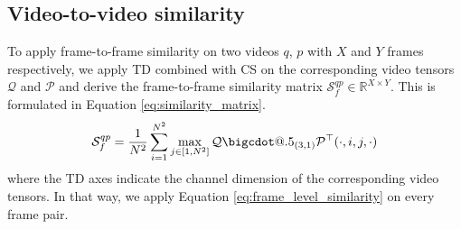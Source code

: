 \documentclass[10pt,twocolumn,letterpaper]{article}
\makeatletter
\newcommand*\bigcdot{\mathpalette\bigcdot@{.5}}
\newcommand*\bigcdot@[2]{\mathbin{\vcenter{\hbox{\scalebox{#2}{$\m@th#1\bullet$}}}}}
\makeatother
\begin{document}
\subsection{Video-to-video similarity}
\label{sec:video_level_similarity}

To apply frame-to-frame similarity on two videos $q$, $p$ with $X$ and $Y$ frames respectively,  we apply TD combined with CS on the corresponding video tensors $\mathcal{Q}$ and $\mathcal{P}$ and derive the frame-to-frame similarity matrix $\mathcal{S}_f^{qp}\in \mathbb{R}^{X\times Y}$. This is formulated in Equation \ref{eq:similarity_matrix}.
\begin{equation}
    \begin{aligned}
    \mathcal{S}_f^{qp} = \frac{1}{N^2}\sum_{i=1}^{N^2} \max_{j \in [1,N^2]} \mathcal{Q} \bigcdot _{(3,1)} \mathcal{P}^\top (\cdot, i, j, \cdot)
    \end{aligned}
    \label{eq:similarity_matrix}
\end{equation}
where the TD axes indicate the channel dimension of the corresponding video tensors. In that way, we apply Equation \ref{eq:frame_level_similarity} on every frame pair. 



\begin{table}[t]
  \centering
  \caption{Architecture of the proposed network for video similarity learning. For the calculation of the output size, we assume that two videos with total number of $X$ and $Y$ frames are provided.}
  \label{tab:cnn_architecture}
\end{table}
\end{document}
